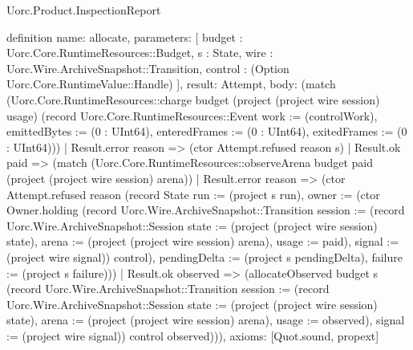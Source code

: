 \begin{lexlean}{Uorc.Product.InspectionReport}
\begin{semanticmodule}
definition{
  name: allocate,
  parameters: [
    budget : Uorc.Core.RuntimeResources::Budget,
    s : State,
    wire : Uorc.Wire.ArchiveSnapshot::Transition,
    control : (Option Uorc.Core.RuntimeValue::Handle)
  ],
  result: Attempt,
  body: (match (Uorc.Core.RuntimeResources::charge budget (project (project wire session) usage) (record Uorc.Core.RuntimeResources::Event {work := (controlWork), emittedBytes := (0 : UInt64), enteredFrames := (0 : UInt64), exitedFrames := (0 : UInt64)}))
    | Result.error reason => (ctor Attempt.refused reason s)
    | Result.ok paid => (match (Uorc.Core.RuntimeResources::observeArena budget paid (project (project wire session) arena))
      | Result.error reason => (ctor Attempt.refused reason (record State {run := (project s run), owner := (ctor Owner.holding (record Uorc.Wire.ArchiveSnapshot::Transition {session := (record Uorc.Wire.ArchiveSnapshot::Session {state := (project (project wire session) state), arena := (project (project wire session) arena), usage := paid}), signal := (project wire signal)}) control), pendingDelta := (project s pendingDelta), failure := (project s failure)}))
      | Result.ok observed => (allocateObserved budget s (record Uorc.Wire.ArchiveSnapshot::Transition {session := (record Uorc.Wire.ArchiveSnapshot::Session {state := (project (project wire session) state), arena := (project (project wire session) arena), usage := observed}), signal := (project wire signal)}) control observed))),
  axioms: [Quot.sound, propext]
}


\end{semanticmodule}
\end{lexlean}

